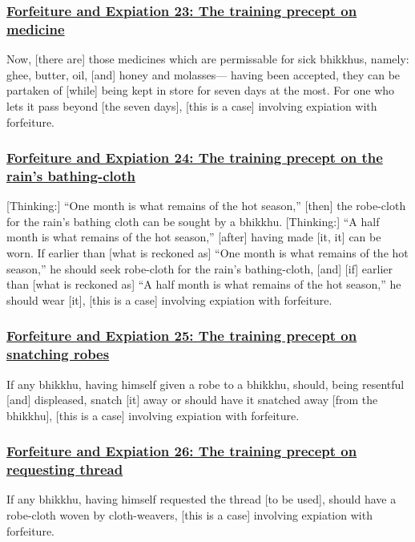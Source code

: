 \subsubsection*{\hyperref[np23]{Forfeiture and Expiation 23: The training precept on medicine}}
\label{forf-exp23}
Now, [there are] those medicines which are permissable for sick bhikkhus, namely: ghee, butter, oil, [and] honey and molasses— having been accepted, they can be partaken of [while] being kept in store for seven days at the most. For one who lets it pass beyond [the seven days], [this is a case] involving expiation with forfeiture.

\subsubsection*{\hyperref[np24]{Forfeiture and Expiation 24: The training precept on the rain's bathing-cloth}}
\label{forf-exp24}
[Thinking:] ``One month is what remains of the hot season,'' [then] the robe-cloth for the rain's bathing cloth can be sought by a bhikkhu. [Thinking:] ``A half month is what remains of the hot season,'' [after] having made [it, it] can be worn. If earlier than [what is reckoned as] ``One month is what remains of the hot season,'' he should seek robe-cloth for the rain's bathing-cloth, [and] [if] earlier than [what is reckoned as] ``A half month is what remains of the hot season,'' he should wear [it], [this is a case] involving expiation with forfeiture.

\subsubsection*{\hyperref[np25]{Forfeiture and Expiation 25: The training precept on snatching robes}}
\label{forf-exp25}
If any bhikkhu, having himself given a robe to a bhikkhu, should, being resentful [and] displeased, snatch [it] away or should have it snatched away [from the bhikkhu], [this is a case] involving expiation with forfeiture.

\subsubsection*{\hyperref[np26]{Forfeiture and Expiation 26: The training precept on requesting thread}}
\label{forf-exp26}
If any bhikkhu, having himself requested the thread [to be used], should have a robe-cloth woven by cloth-weavers, [this is a case] involving expiation with forfeiture.

